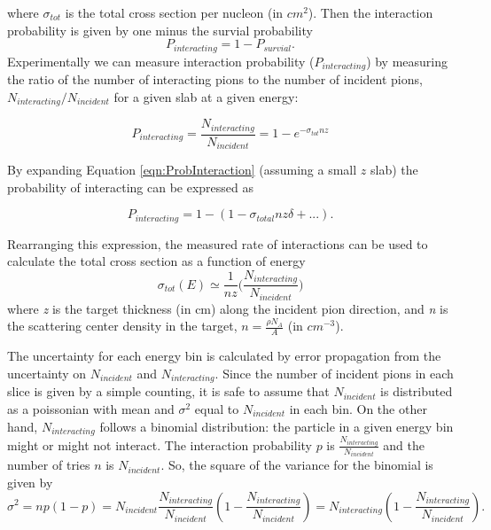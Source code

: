 where $\sigma_{tot}$ is the total cross section per nucleon (in $cm^2$). Then the interaction probability is given by one minus the survial probability
\begin{equation}
P_{interacting} = 1 - P_{survial}.
\end{equation}
Experimentally we can measure interaction probability ($P_{interacting}$) by measuring the ratio of the number of interacting pions to the number of incident pions, $N_{interacting}/N_{incident}$ for a given slab at a given energy:

\begin{equation}\label{eqn:ProbInteraction}
P_{interacting}=\frac{N_{interacting}}{N_{incident}}=1-e^{-\sigma_{tot}n z}
\end{equation}

By expanding Equation \ref{eqn:ProbInteraction} (assuming a small $z$ slab) the probability of interacting can be expressed as

\begin{equation}
P_{interacting} = 1 - (1-\sigma_{total}n z \delta + ...).
\end{equation}

Rearranging this expression, the measured rate of interactions can be used to calculate the total cross section as a function of energy
\begin{equation}\label{calc_sigma}
\sigma_{tot}(E) \simeq \frac{1}{nz} \Big(\frac{N_{interacting}}{N_{incident}}\Big) 
\end{equation}
where {\emph{z}} is the target thickness (in cm) along the incident pion direction, and {\emph{n}} is the scattering center density in the target, $n=\frac{\rho N_{A} }{A}$ (in $cm^{-3}$). 

The uncertainty for each energy bin is calculated by error propagation from the uncertainty on $N_{incident}$ and $N_{interacting}$. 
Since the number of incident pions in each slice is given by a simple counting, it is safe to assume that $N_{incident}$ is distributed as a poissonian with mean and $\sigma^2$ equal to $N_{incident}$ in each bin.  
On the other hand, $N_{interacting}$ follows a binomial distribution: the particle in a given energy bin might or might not interact.  The interaction probability $p$ is $\frac{ N_{interacting}}{N_{incident}}$ and the number of tries $n$ is $N_{incident}$. 
So, the square of the variance for the binomial is given by  $$\sigma^2 = np(1-p) =  N_{incident}\frac{ N_{interacting}}{N_{incident}} (1-\frac{ N_{interacting}}{N_{incident}}) = N_{interacting}(1-\frac{ N_{interacting}}{N_{incident}}).$$

